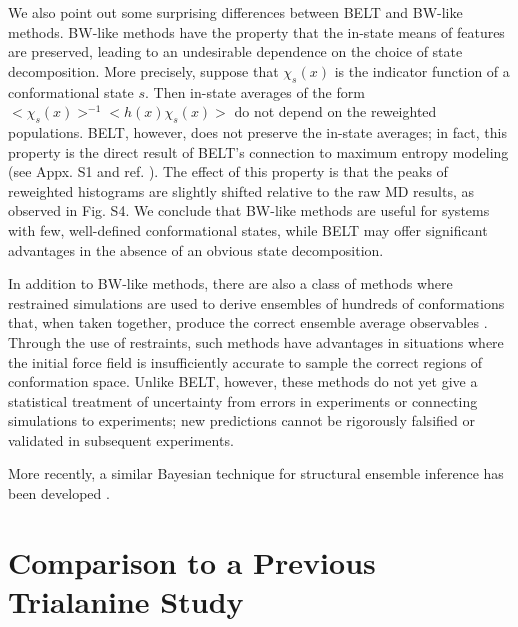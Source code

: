 \documentclass[12pt]{article}
\begin{document}
We also point out some surprising differences between BELT and BW-like methods.  BW-like methods have the property that the in-state means of features are preserved, leading to an undesirable dependence on the choice of state decomposition.  More precisely, suppose that $\chi_s(x)$ is the indicator function of a conformational state $s$.  Then in-state averages of the form $<\chi_s(x)>^{-1} <h(x) \chi_s(x)>$ do not depend on the reweighted populations.  BELT, however, does not preserve the in-state averages; in fact, this property is the direct result of BELT's connection to maximum entropy modeling (see Appx. S1 and ref.  \cite{chodera2012}).  The effect of this property is that the peaks of reweighted histograms are slightly shifted relative to the raw MD results, as observed in Fig. S4.   We conclude that BW-like methods are useful for systems with few, well-defined conformational states, while BELT may offer significant advantages in the absence of an obvious state decomposition.  

In addition to BW-like methods, there are also a class of methods where restrained simulations are used to derive ensembles of hundreds of conformations that, when taken together, produce the correct ensemble average observables \cite{richter2007mumo, lindorff2005simultaneous}.  Through the use of restraints, such methods have advantages in situations where the initial force field is insufficiently accurate to sample the correct regions of conformation space.  Unlike BELT, however, these methods do not yet give a statistical treatment of uncertainty from errors in experiments or connecting simulations to experiments; new predictions cannot be rigorously falsified or validated in subsequent experiments.

More recently, a similar Bayesian technique for structural ensemble inference has been developed \cite{olsson2013inference}.  

\section*{Comparison to a Previous Trialanine Study}
\end{document}
